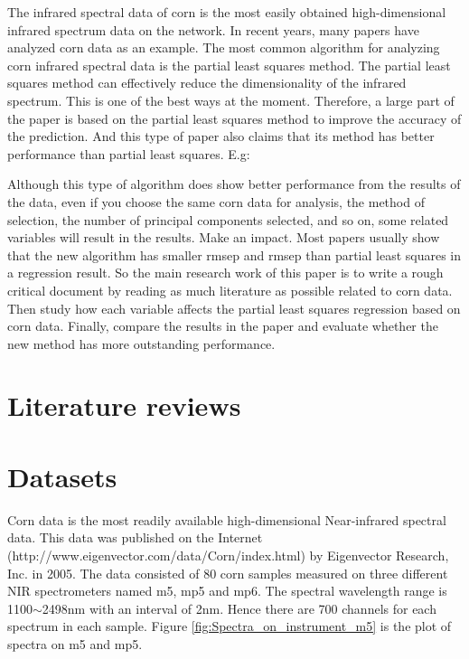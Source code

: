 \documentclass[a4paper,12pt,titlepage]{article} %
\numberwithin{equation}{section}  %
\begin{document}
	The infrared spectral data of corn is the most easily obtained high-dimensional infrared spectrum data on the network. In recent years, many papers have analyzed corn data as an example. The most common algorithm for analyzing corn infrared spectral data is the partial least squares method. The partial least squares method can effectively reduce the dimensionality of the infrared spectrum. This is one of the best ways at the moment. Therefore, a large part of the paper is based on the partial least squares method to improve the accuracy of the prediction. And this type of paper also claims that its method has better performance than partial least squares. E.g:   
	
	Although this type of algorithm does show better performance from the results of the data, even if you choose the same corn data for analysis, the method of selection, the number of principal components selected, and so on, some related variables will result in the results. Make an impact. Most papers usually show that the new algorithm has smaller rmsep and rmsep than partial least squares in a regression result. So the main research work of this paper is to write a rough critical document by reading as much literature as possible related to corn data. Then study how each variable affects the partial least squares regression based on corn data. Finally, compare the results in the paper and evaluate whether the new method has more outstanding performance.
	
	
	\section{Literature reviews}
	\label{sec:liter}
	
	\section{Datasets}
	\label{sec:data}
	
	Corn data is the most readily available high-dimensional Near-infrared spectral data. This data was published on the Internet (http://www.eigenvector.com/data/Corn/index.html) by Eigenvector Research, Inc. in 2005. The data consisted of 80 corn samples measured on three different NIR spectrometers named m5, mp5 and mp6. The spectral wavelength range is 1100$\sim$2498nm with an interval of 2nm. Hence there are 700 channels for each spectrum in each sample. Figure \ref{fig:Spectra_on_instrument_m5} is the plot of spectra on m5 and mp5.
	
\end{document}
